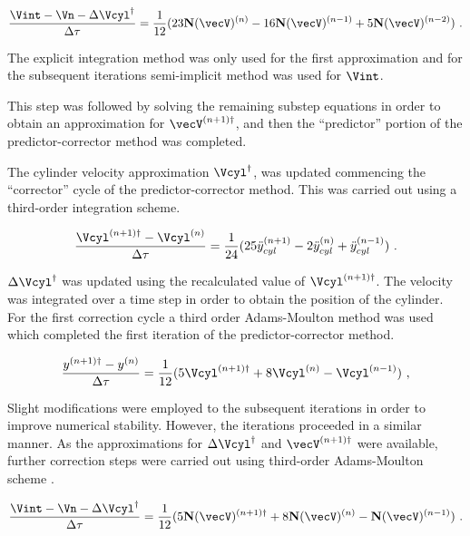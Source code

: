 \begin{equation} \centering
\label{eq:vint_first}
\frac{\Vint - \Vn - \Delta\Vcyl^{\dag}}{\Delta\tau} = \frac{1}{12}(23\mathbf{N}(\vecV)^{(n)} - 16\mathbf{N}(\vecV)^{(n-1)} + 5\mathbf{N}(\vecV)^{(n-2)}) ~.
\end{equation}

The explicit integration method was only used for the first approximation and for the subsequent iterations semi-implicit method was used for $\Vint$.

This step was followed by solving the remaining substep equations in order to obtain an approximation for  $\vecV^{(n+1)\dag}$, and then the ``predictor'' portion of the predictor-corrector method was completed.

The cylinder velocity approximation $\Vcyl^{\dag}$, was updated commencing the ``corrector'' cycle of the predictor-corrector method. This was carried out using a third-order integration scheme. 

 \begin{equation} \centering
 \label{eq:vcyl_correct}
 \frac{\Vcyl^{(n+1)\dag} - \Vcyl^{(n)}}{\Delta\tau} = \frac{1}{24}(25\ddot{y}_{cyl}^{(n+1)} - 2\ddot{y}_{cyl}^{(n)} + \ddot{y}_{cyl}^{(n-1)}) ~.
 \end{equation}
 
 $\Delta\Vcyl^{\dag}$ was updated using the recalculated value of $\Vcyl^{(n+1)\dag}$. The velocity was integrated over a time step in order to obtain the position of the cylinder. For the first correction cycle a third order Adams-Moulton method was used which completed the first iteration of the predictor-corrector method. 
 
 \begin{equation} \centering
 \label{eq:ycyl_correct}
 \frac{y^{(n+1)\dag} - y^{(n)}}{\Delta\tau} = \frac{1}{12}(5\Vcyl^{(n+1)\dag} + 8\Vcyl^{(n)} - \Vcyl^{(n-1)}) ~,
 \end{equation}
 
 Slight modifications were employed to the subsequent iterations in order to improve numerical stability. However, the iterations proceeded in a similar manner. As the approximations for  $\Delta\Vcyl^{\dag}$ and $\vecV^{(n+1)\dag}$  were available, further correction steps were carried out using third-order Adams-Moulton scheme . 
 
 \begin{equation} \centering
 \label{eq:predict_general}
 \frac{\Vint - \Vn - \Delta\Vcyl^{\dag}}{\Delta\tau} = \frac{1}{12}(5\mathbf{N}(\vecV)^{(n+1)\dag} + 8\mathbf{N}(\vecV)^{(n)} - \mathbf{N}(\vecV)^{(n-1)}) ~.
 \end{equation}
 

